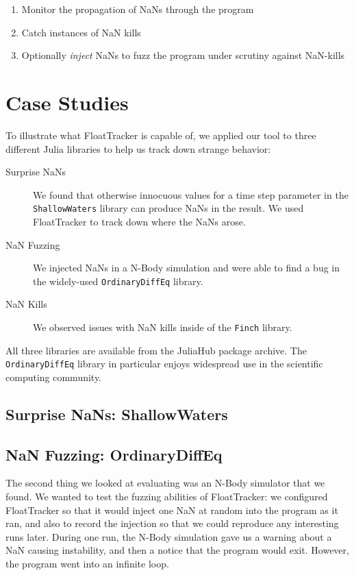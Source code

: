 \documentclass{juliacon}
\begin{document}
\begin{enumerate}
  \item Monitor the propagation of NaNs through the program
  \item Catch instances of NaN kills
  \item Optionally \emph{inject} NaNs to fuzz the program under scrutiny against NaN-kills
\end{enumerate}


\section{Case Studies}

To illustrate what FloatTracker is capable of, we applied our tool to three different Julia libraries to help us track down strange behavior:

\begin{description}
\item[Surprise NaNs] We found that otherwise innocuous values for a time step parameter in the \texttt{ShallowWaters} library can produce NaNs in the result.
  We used FloatTracker to track down where the NaNs arose.
\item[NaN Fuzzing] We injected NaNs in a N-Body simulation and were able to find a bug in the widely-used \texttt{OrdinaryDiffEq} library.
\item[NaN Kills] We observed issues with NaN kills inside of the \texttt{Finch} library.
\end{description}

All three libraries are available from the JuliaHub package archive.
The \texttt{OrdinaryDiffEq} library in particular enjoys widespread use in the scientific computing community.

\subsection{Surprise NaNs: ShallowWaters}

\subsection{NaN Fuzzing: OrdinaryDiffEq}

The second thing we looked at evaluating was an N-Body simulator that we found.
We wanted to test the fuzzing abilities of FloatTracker:
we configured FloatTracker so that it would inject one NaN at random into the program as it ran, and also to record the injection so that we could reproduce any interesting runs later.
During one run, the N-Body simulation gave us a warning about a NaN causing instability, and then a notice that the program would exit.
However, the program went into an infinite loop.
\end{document}
